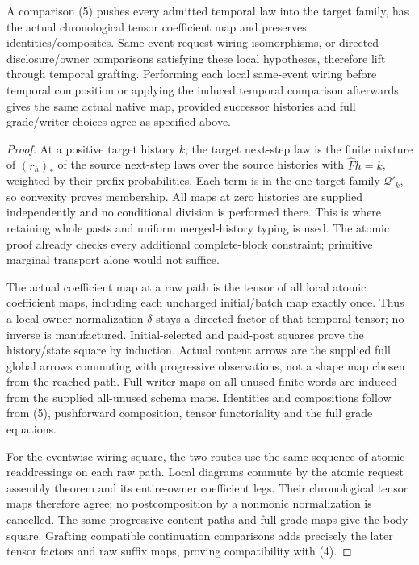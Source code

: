 \documentclass[11pt]{article}\usepackage{amsmath,amssymb,amsthm,geometry}\geometry{margin=1in}
\begin{document}
\begin{theorem}
A comparison (5) pushes every admitted temporal law into the target family, has the actual chronological tensor coefficient map and preserves identities/composites. Same-event request-wiring isomorphisms, or directed disclosure/owner comparisons satisfying these local hypotheses, therefore lift through temporal grafting. Performing each local same-event wiring before temporal composition or applying the induced temporal comparison afterwards gives the same actual native map, provided successor histories and full grade/writer choices agree as specified above.
\end{theorem}
\begin{proof}
At a positive target history $k$, the target next-step law is the finite mixture of $(r_h)_*$ of the source next-step laws over the source histories with $\widehat Fh=k$, weighted by their prefix probabilities. Each term is in the one target family $\mathcal Q'_k$, so convexity proves membership. All maps at zero histories are supplied independently and no conditional division is performed there. This is where retaining whole pasts and uniform merged-history typing is used. The atomic proof already checks every additional complete-block constraint; primitive marginal transport alone would not suffice.

The actual coefficient map at a raw path is the tensor of all local atomic coefficient maps, including each uncharged initial/batch map exactly once. Thus a local owner normalization $\delta$ stays a directed factor of that temporal tensor; no inverse is manufactured. Initial-selected and paid-post squares prove the history/state square by induction. Actual content arrows are the supplied full global arrows commuting with progressive observations, not a shape map chosen from the reached path. Full writer maps on all unused finite words are induced from the supplied all-unused schema maps. Identities and compositions follow from (5), pushforward composition, tensor functoriality and the full grade equations.

For the eventwise wiring square, the two routes use the same sequence of atomic readdressings on each raw path. Local diagrams commute by the atomic request assembly theorem and its entire-owner coefficient legs. Their chronological tensor maps therefore agree; no postcomposition by a nonmonic normalization is cancelled. The same progressive content paths and full grade maps give the body square. Grafting compatible continuation comparisons adds precisely the later tensor factors and raw suffix maps, proving compatibility with (4).\end{proof}
\end{document}
